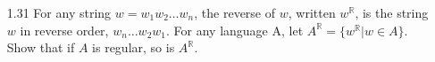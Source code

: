 \begin{enumerate}

    \item [1.31]
          For any string $w = w_1w_2\ldots w_n$, the reverse of $w$, written $w^\mathbb{R}$, is the string $w$ in reverse order, $w_n \ldots w_2w_1$. For any language A, let $A^\mathbb{R} = \{w^\mathbb{R}| w \in A\}$. Show that if $A$ is regular, so is $A^\mathbb{R}$.

          
\end{enumerate}

